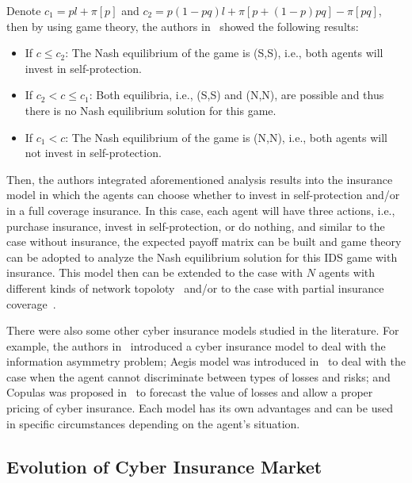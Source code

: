 \documentclass[twocolumn,10pt]{IEEEtran}
\begin{document}
Denote $c_1=pl+ \pi[p]$ and $c_2 = p(1-pq)l + \pi[p+(1-p)pq] - \pi[pq]$, then by using game theory, the authors in~\cite{Bolot2008Cyber} showed the following results:
\begin{itemize}
	\item If $c\leq c_2$: The Nash equilibrium of the game is (S,S), i.e., both agents will invest in self-protection.
	\item If $c_2<c\leq c_1$: Both equilibria, i.e., (S,S) and (N,N), are possible and thus there is no Nash equilibrium solution for this game. 
	\item If $c_1<c$: The Nash equilibrium of the game is (N,N), i.e., both agents will not invest in self-protection.
\end{itemize}

Then, the authors integrated aforementioned analysis results into the insurance model in which the agents can choose whether to invest in self-protection and/or in a full coverage insurance. In this case, each agent will have three actions, i.e., purchase insurance, invest in self-protection, or do nothing, and similar to the case without insurance, the expected payoff matrix can be built and game theory can be adopted to analyze the Nash equilibrium solution for this IDS game with insurance. This model then can be extended to the case with $N$ agents with different kinds of network topoloty~\cite{Bolot2008Cyber} and/or to the case with partial insurance coverage~\cite{Pal2010Analyzing}.

There were also some other cyber insurance models studied in the literature. For example, the authors in~\cite{Pal2012Cyber} introduced a cyber insurance model to deal with the information asymmetry problem; Aegis model was introduced in~\cite{Pal2011CyberAegis} to deal with the case when the agent cannot discriminate between types of losses and risks; and Copulas was proposed in~\cite{Herath2011Copula} to forecast the value of losses and allow a proper pricing of cyber insurance. Each model has its own advantages and can be used in specific circumstances depending on the agent's situation. 






\subsection{Evolution of Cyber Insurance Market}
\end{document}
